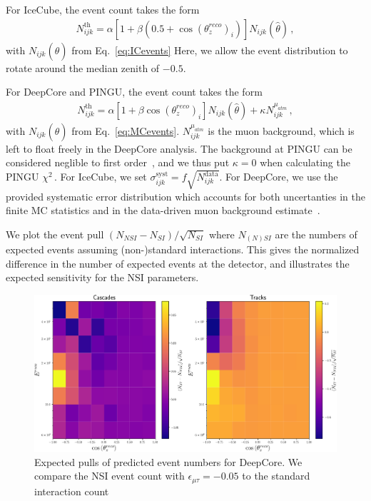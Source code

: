 \documentclass[draft=True]{revtex4-2}
\newcommand{\zreco}{\ensuremath{\cos{(\theta_z^{reco})}}}
\newcommand{\emt}{\ensuremath{\epsilon_{\mu\tau}}}
\begin{document}
For IceCube, the event count takes the form
\begin{align}
    N^\text{th}_{ijk} = \alpha\left[1+\beta (0.5 + \zreco_i )\right] N_{ijk}(\hat{\theta})\,,
\end{align}
with $N_{ijk}(\hat{\theta})$ from Eq.~\ref{eq:ICevents} Here, we allow the event distribution to rotate around the median zenith of $-0.5$.

For DeepCore and PINGU, the event count takes the form
\begin{align}
    N^\text{th}_{ijk} = \alpha\left[1+\beta \zreco_i \right] N_{ijk}(\hat{\theta}) + \kappa N_{ijk}^{\mu_{atm}}\,,
\end{align}
with $N_{ijk}(\hat{\theta})$ from Eq.~\ref{eq:MCevents}. $N_{ijk}^{\mu_{atm}}$ is the muon background, which is left to float freely in the DeepCore analysis.
The background at PINGU can be considered neglible to first order~\cite{PINGUdata}, and we thus put $\kappa=0$ when calculating the PINGU $\chi^2$\,.
For IceCube, we set $\sigma_{ijk}^\text{syst} = f\sqrt{N_{ijk}^\text{data}}$.
For DeepCore, we use the provided systematic error distribution which accounts for both uncertanties in the finite MC statistics and in the data-driven 
muon background estimate~\cite{DC2019data}.








We plot the event pull $(N_{NSI} - N_{SI})/\sqrt{N_{SI}}$ where $N_{(N)SI}$ are the numbers of expected events
assuming (non-)standard interactions. This gives the normalized difference in the
number of expected events at the detector, and illustrates the expected sensitivity for the NSI parameters.

\begin{figure}[!tb]
    \begin{center}
       \includegraphics[width=0.7\linewidth]{figures/DC_event_pulls.pdf}
    \end{center}
    \caption{Expected pulls of predicted event numbers for DeepCore. We compare the NSI event count with $\emt=-0.05$
     to the standard interaction count}\label{fig:DC_event_pulls}
 \end{figure}
\end{document}
